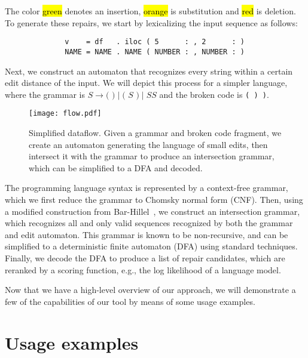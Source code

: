 \documentclass[runningheads]{llncs}
\DeclareRobustCommand{\hlred}[1]{{\sethlcolor{lred}\hl{#1}}}
\DeclareRobustCommand{\hlorange}[1]{{\sethlcolor{lorange}\hl{#1}}}
\DeclareRobustCommand{\hlgreen}[1]{{\sethlcolor{lgreen}\hl{#1}}}
\begin{document}
\vspace{-0.3cm}\noindent The color \hlgreen{green} denotes an insertion, \hlorange{orange} is substitution and \hlred{red} is deletion. To generate these repairs, we start by lexicalizing the input sequence as follows:

\begin{verbatim}
              v    = df   . iloc ( 5      : , 2      : )
              NAME = NAME . NAME ( NUMBER : , NUMBER : )
\end{verbatim}

\noindent Next, we construct an automaton that recognizes every string within a certain edit distance of the input. We will depict this process for a simpler language, where the grammar is $S \rightarrow \texttt{( )} \mid \texttt{( } S \texttt{ )} \mid S S$ and the broken code is \texttt{( ) )}.\vspace{-0.3cm}

\begin{figure}[h!]
  \texttt{[image: flow.pdf]}\vspace{-1pt}
  \caption{Simplified dataflow. Given a grammar and broken code fragment, we create an automaton generating the language of small edits, then intersect it with the grammar to produce an intersection grammar, which can be simplified to a DFA and decoded.}\label{fig:arch_simp}
\end{figure}\vspace{-0.3cm}

The programming language syntax is represented by a context-free grammar, which we first reduce the grammar to Chomsky normal form (CNF). Then, using a modified construction from Bar-Hillel~\cite{bar1961formal}, we construct an intersection grammar, which recognizes all and only valid sequences recognized by both the grammar and edit automaton. This grammar is known to be non-recursive, and can be simplified to a deterministic finite automaton (DFA) using standard techniques. Finally, we decode the DFA to produce a list of repair candidates, which are reranked by a scoring function, e.g., the log likelihood of a language model.

Now that we have a high-level overview of our approach, we will demonstrate a few of the capabilities of our tool by means of some usage examples.

\section{Usage examples}
\end{document}
